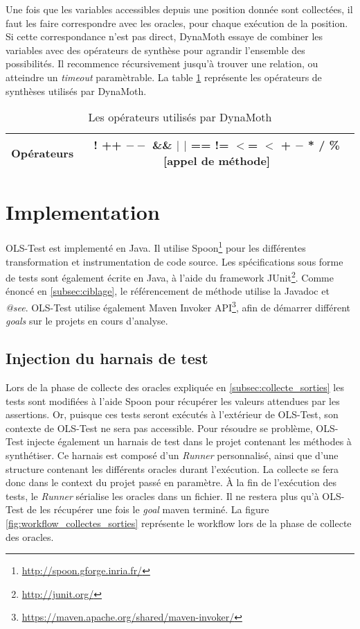\par Une fois que les variables accessibles depuis une position donnée sont collectées, il faut les faire correspondre avec les oracles, pour chaque exécution de la position. Si cette correspondance n'est pas direct, DynaMoth essaye de combiner les variables avec des opérateurs de synthèse pour agrandir l'ensemble des possibilités. Il recommence récursivement jusqu'à trouver une relation, ou atteindre un \textit{timeout} paramètrable. La table \ref{fig:operateurs} représente les opérateurs de synthèses utilisés par DynaMoth.

\begin{table}[H]
\centering
\begin{tabular}{|c|c|}
\hline
Opérateurs & ! ++ $--$ \&\& $|$ $|$ == != $<$= $<$ + $-$ * / \% [appel de méthode]\\
\hline
\end{tabular}
\caption{Les opérateurs utilisés par DynaMoth}
\label{fig:operateurs}
\end{table}
 

\section{Implementation}
\label{sec:implementation}

\par OLS-Test est implementé en Java. Il utilise Spoon\footnote{\url{http://spoon.gforge.inria.fr/}} pour les différentes transformation et instrumentation de code source. Les spécifications sous forme de tests sont également écrite en Java, à l'aide du framework JUnit\footnote{\url{http://junit.org/}}. Comme énoncé en \ref{subsec:ciblage}, le référencement de méthode utilise la Javadoc et \textit{@see}. OLS-Test utilise également Maven Invoker API\footnote{\url{https://maven.apache.org/shared/maven-invoker/}}, afin de démarrer différent \textit{goals} sur le projets en cours d'analyse.


\subsection{Injection du harnais de test}

\par Lors de la phase de collecte des oracles expliquée en \ref{subsec:collecte_sorties} les tests sont modifiées à l'aide Spoon pour récupérer les valeurs attendues par les assertions. Or, puisque ces tests seront exécutés à l'extérieur de OLS-Test, son contexte de OLS-Test ne sera pas accessible. Pour résoudre se problème, OLS-Test injecte également un harnais de test dans le projet contenant les méthodes à synthétiser. Ce harnais est composé d'un \textit{Runner} personnalisé, ainsi que d'une structure contenant les différents oracles durant l'exécution. La collecte se fera donc dans le context du projet passé en paramètre. À la fin de l'exécution des tests, le \textit{Runner} sérialise les oracles dans un fichier. Il ne restera plus qu'à OLS-Test de les récupérer une fois le \textit{goal} maven terminé. La figure \ref{fig:workflow_collectes_sorties} représente le workflow lors de la phase de collecte des oracles.

